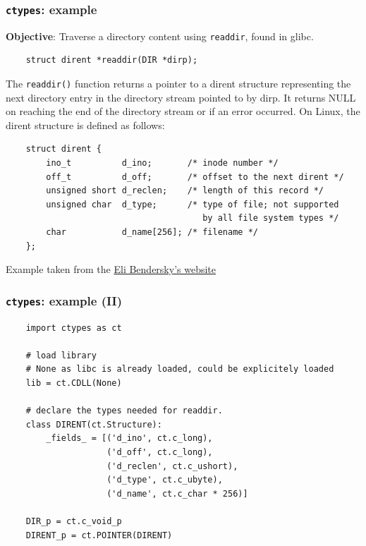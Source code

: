 \documentclass[handout]{beamer}
\begin{document}
\begin{frame}[fragile]
  \frametitle{\texttt{ctypes}: example}

  \textbf{Objective}: Traverse a directory content using \texttt{readdir},
  found in glibc.

  \begin{verbatim}
    struct dirent *readdir(DIR *dirp);
  \end{verbatim}

  The \texttt{readdir()} function returns a pointer to a dirent structure
  representing the next directory entry in the directory stream pointed to by
  dirp. It returns NULL on reaching the end of the directory stream or if an
  error occurred. On Linux, the dirent structure is defined as follows:

  \begin{verbatim}
    struct dirent {
        ino_t          d_ino;       /* inode number */
        off_t          d_off;       /* offset to the next dirent */
        unsigned short d_reclen;    /* length of this record */
        unsigned char  d_type;      /* type of file; not supported
                                       by all file system types */
        char           d_name[256]; /* filename */
    };
  \end{verbatim}

  \tiny Example taken from the
  \href{https://eli.thegreenplace.net/2013/03/09/python-ffi-with-ctypes-and-cffi/}{Eli Bendersky's website}
\end{frame}

\begin{frame}[fragile]
  \frametitle{\texttt{ctypes}: example (II)}

  \begin{verbatim}
    import ctypes as ct

    # load library
    # None as libc is already loaded, could be explicitely loaded
    lib = ct.CDLL(None)

    # declare the types needed for readdir.
    class DIRENT(ct.Structure):
        _fields_ = [('d_ino', ct.c_long),
                    ('d_off', ct.c_long),
                    ('d_reclen', ct.c_ushort),
                    ('d_type', ct.c_ubyte),
                    ('d_name', ct.c_char * 256)]

    DIR_p = ct.c_void_p
    DIRENT_p = ct.POINTER(DIRENT)
  \end{verbatim}
\end{frame}
\end{document}
